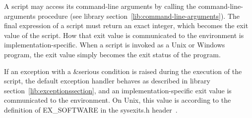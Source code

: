 A script may access its command-line arguments by calling the {\cf
  command-line-arguments} procedure (see
library section~\ref{lib:command-line-arguments}).  The final expression of a
script must return an exact integer, which becomes the exit value of
the script.  How that exit value is communicated to the environment is
implementation-specific.  When a script is invoked as a Unix or
Windows program, the exit value simply becomes the exit status of the
program.

If an exception with a {\cf\&serious} condition is raised during the
execution of the script, the default exception handler behaves as
described in library section~\ref{lib:exceptionssection}, and an
implementation-specific exit value is communicated to the
environment.  On Unix, this value is according to the definition of
{\cf EX\_SOFTWARE} in the {\cf sysexits.h} header~\cite{srfi22}.

